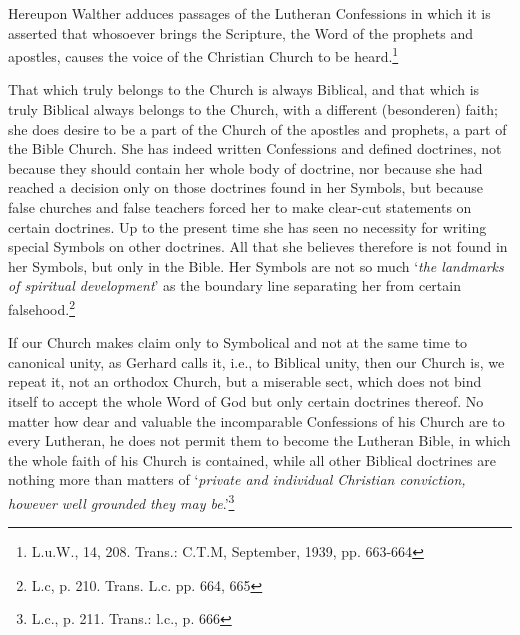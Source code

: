                 Hereupon Walther adduces passages of the Lutheran Confessions in which it is asserted that whosoever brings the Scripture, the Word of the prophets and apostles, causes the voice of the Christian Church to be heard.\footnote{L.u.W., 14, 208. Trans.: C.T.M, September, 1939, pp. 663-664} \begin{fancyquotes}That which truly belongs to the Church is always Biblical, and that which is truly Biblical always belongs to the Church, with a different (besonderen) faith; she does desire to be a part of the Church of the apostles and prophets, a part of the Bible Church.  She has indeed written Confessions and defined doctrines, not because they should contain her whole body of doctrine, nor because she had reached a decision only on those doctrines found in her Symbols, but because false churches and false teachers forced her to make clear-cut statements on certain doctrines.  Up to the present time she has seen no necessity for writing special Symbols on other doctrines.  All that she believes therefore is not found in her Symbols, but only in the Bible.  Her Symbols are not so much ‘\textit{the landmarks of spiritual development}’ as the boundary line separating her from certain falsehood.\footnote{L.c, p. 210.  Trans. L.c. pp. 664, 665}\end{fancyquotes}\divider \begin{fancyquotes}If  our Church makes claim only to Symbolical and not at the same time to canonical unity, as Gerhard calls it, i.e., to Biblical unity, then our Church is, we repeat it, not an orthodox Church, but a miserable sect, which does not bind itself to accept the whole Word of God but only certain doctrines thereof.  No matter how dear and valuable the incomparable Confessions of his Church are to every Lutheran, he does not permit them to become the Lutheran Bible, in which the whole faith of his Church is contained, while all other Biblical doctrines are nothing more than matters of ‘\textit{private and individual Christian conviction, however well grounded they may be}.’\footnote{L.c., p. 211. Trans.: l.c., p. 666}\end{fancyquotes}

